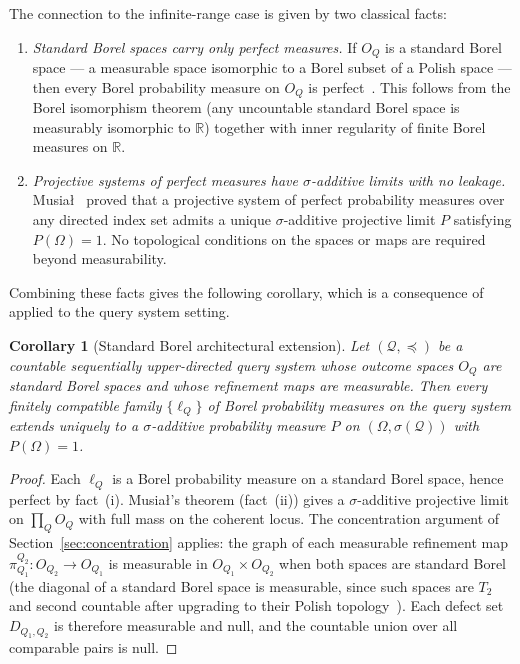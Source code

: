 \documentclass[11pt]{article}
\newtheorem{corollary}{Corollary}
\theoremstyle{definition}
\newcommand{\Qcal}{\mathcal{Q}}
\begin{document}
The connection to the infinite-range case is given by two classical
facts:
\begin{enumerate}[label=(\roman*)]
\item \emph{Standard Borel spaces carry only perfect measures.}
  If $O_Q$ is a standard Borel space --- a measurable space
  isomorphic to a Borel subset of a Polish space --- then every
  Borel probability measure on $O_Q$ is perfect~\cite{Bogachev2007,
  Fremlin2003}.  This follows from the Borel isomorphism theorem
  (any uncountable standard Borel space is measurably isomorphic
  to $\mathbb{R}$) together with inner regularity of finite Borel
  measures on $\mathbb{R}$.
\item \emph{Projective systems of perfect measures have
  $\sigma$-additive limits with no leakage.}
  Musia{\l}~\cite{Musial1980} proved that a projective system of
  perfect probability measures over any directed index set admits a
  unique $\sigma$-additive projective limit $P$ satisfying
  $P(\Omega) = 1$.  No topological conditions on the spaces or maps
  are required beyond measurability.
\end{enumerate}
Combining these facts gives the following corollary, which is a
consequence of~\cite{Musial1980} applied to the query system setting.

\begin{corollary}[Standard Borel architectural extension]
\label{cor:standard-borel}
Let $(\Qcal, \preceq)$ be a countable sequentially upper-directed
query system whose outcome spaces $O_Q$ are standard Borel spaces
and whose refinement maps are measurable.  Then every finitely
compatible family $\{\ell_Q\}$ of Borel probability measures on
the query system extends uniquely to a $\sigma$-additive probability
measure $P$ on $(\Omega, \sigma(\Qcal))$ with $P(\Omega) = 1$.
\end{corollary}

\begin{proof}
Each $\ell_Q$ is a Borel probability measure on a standard Borel
space, hence perfect by fact~(i).  Musia{\l}'s theorem (fact~(ii))
gives a $\sigma$-additive projective limit on $\prod_Q O_Q$ with
full mass on the coherent locus.  The concentration argument of
Section~\ref{sec:concentration} applies: the graph of each
measurable refinement map $\pi^{Q_2}_{Q_1}: O_{Q_2} \to O_{Q_1}$
is measurable in $O_{Q_1} \times O_{Q_2}$ when both spaces are
standard Borel (the diagonal of a standard Borel space is
measurable, since such spaces are $T_2$ and second countable after
upgrading to their Polish topology~\cite{Srivastava1998}).  Each
defect set $D_{Q_1,Q_2}$ is therefore measurable and null, and
the countable union over all comparable pairs is null.
\end{proof}
\end{document}
